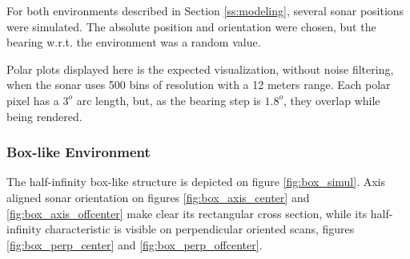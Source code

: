 For both environments described in Section \ref{ss:modeling}, several sonar
positions were simulated. The absolute position and orientation were chosen, but
the bearing w.r.t. the environment was a random value.

Polar plots displayed here is the expected visualization, without noise
filtering, when the sonar uses 500 bins of resolution with a 12 meters range.
Each polar pixel has a $3^o$ arc length, but, as the bearing step is $1.8^o$,
they overlap while being rendered.

\subsubsection{Box-like Environment}
The half-infinity box-like structure is depicted on figure
\ref{fig:box_simul}. Axis aligned sonar orientation on figures
\ref{fig:box_axis_center} and \ref{fig:box_axis_offcenter} make clear its
rectangular cross section, while its half-infinity characteristic is visible on
perpendicular oriented scans, figures \ref{fig:box_perp_center} and
\ref{fig:box_perp_offcenter}.


